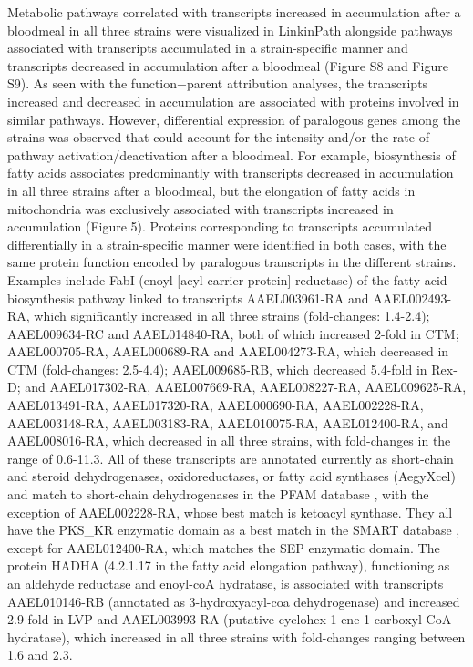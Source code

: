Metabolic pathways correlated with transcripts increased in accumulation after a bloodmeal in all three strains were visualized in LinkinPath \cite{Ingsriswang2011} alongside pathways associated with transcripts accumulated in a strain-specific manner and transcripts decreased in accumulation after a bloodmeal (Figure S8 and Figure S9). As seen with the function−parent attribution analyses, the transcripts increased and decreased in accumulation are associated with proteins involved in similar pathways. However, differential expression of paralogous genes among the strains was observed that could account for the intensity and/or the rate of pathway activation/deactivation after a bloodmeal. For example, biosynthesis of fatty acids associates predominantly with transcripts decreased in accumulation in all three strains after a bloodmeal, but the elongation of fatty acids in mitochondria was exclusively associated with transcripts increased in accumulation (Figure 5). Proteins corresponding to transcripts accumulated differentially in a strain-specific manner were identified in both cases, with the same protein function encoded by paralogous transcripts in the different strains. Examples include FabI (enoyl-[acyl carrier protein] reductase) of the fatty acid biosynthesis pathway linked to transcripts AAEL003961-RA and AAEL002493-RA, which significantly increased in all three strains (fold-changes: 1.4-2.4); AAEL009634-RC and AAEL014840-RA, both of which increased 2-fold in CTM; AAEL000705-RA, AAEL000689-RA and AAEL004273-RA, which decreased in CTM (fold-changes: 2.5-4.4); AAEL009685-RB, which decreased 5.4-fold in Rex-D; and AAEL017302-RA, AAEL007669-RA, AAEL008227-RA, AAEL009625-RA, AAEL013491-RA, AAEL017320-RA, AAEL000690-RA, AAEL002228-RA, AAEL003148-RA, AAEL003183-RA, AAEL010075-RA, AAEL012400-RA, and AAEL008016-RA, which decreased in all three strains, with fold-changes in the range of 0.6-11.3. All of these transcripts are annotated currently as short-chain and steroid dehydrogenases, oxidoreductases, or fatty acid synthases (AegyXcel) and match to short-chain dehydrogenases in the PFAM database \cite{Finn2008}, with the exception of AAEL002228-RA, whose best match is ketoacyl synthase. They all have the PKS_KR enzymatic domain as a best match in the SMART database \cite{Letunic2009}, except for AAEL012400-RA, which matches the SEP enzymatic domain. The protein HADHA (4.2.1.17 in the fatty acid elongation pathway), functioning as an aldehyde reductase and enoyl-coA hydratase, is associated with transcripts AAEL010146-RB (annotated as 3-hydroxyacyl-coa dehydrogenase) and increased 2.9-fold in LVP and AAEL003993-RA (putative cyclohex-1-ene-1-carboxyl-CoA hydratase), which increased in all three strains with fold-changes ranging between 1.6 and 2.3.

